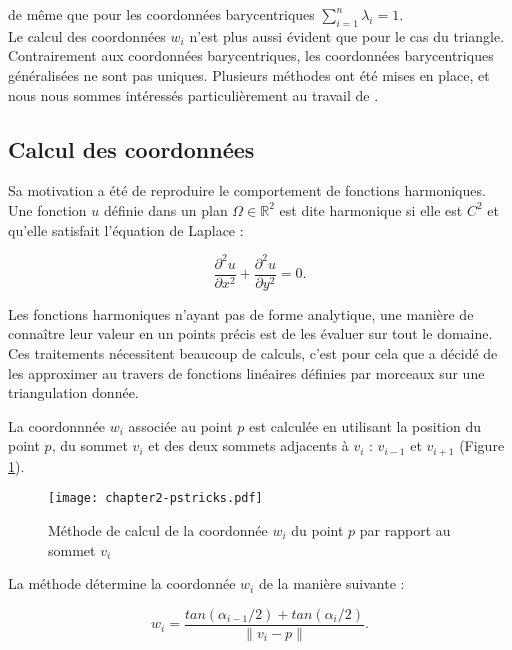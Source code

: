 de même que pour les coordonnées barycentriques $\sum_{i=1}^n \lambda_i = 1$.
\\

Le calcul des coordonnées $w_i$ n'est plus aussi évident que pour le cas du
triangle. Contrairement aux coordonnées barycentriques, les coordonnées
barycentriques généralisées ne sont pas uniques. Plusieurs méthodes ont été
mises en place, et nous nous sommes intéressés particulièrement au travail de
\cite{Flo03}.

\subsection{Calcul des coordonnées}

Sa motivation a été de reproduire le comportement de fonctions harmoniques.
Une fonction $u$ définie dans un plan $\Omega \in \mathbb{R}^2$ est dite
harmonique si elle est $C^2$ et qu'elle satisfait l'équation de Laplace :

\begin{equation}
  \frac{\partial^2 u}{\partial x^2} + \frac{\partial^2 u}{\partial y^2} = 0.
\end{equation}

Les fonctions harmoniques n'ayant pas de forme analytique, une manière de
connaître leur valeur en un points précis est de les évaluer sur tout le
domaine. Ces traitements nécessitent beaucoup de calculs, c'est pour cela que
\cite{Flo03} a décidé de les approximer au travers de fonctions linéaires
définies par morceaux sur une triangulation donnée.

La coordonnnée $w_i$ associée au point $p$ est calculée en utilisant la
position du point $p$, du sommet $v_i$ et des deux sommets adjacents à $v_i$ :
$v_{i-1}$ et $v_{i+1}$ (Figure \ref{DEFcal}).

\begin{figure}[ht]
  \begin{center}
    \texttt{[image: chapter2-pstricks.pdf]}

    \caption[Méthode de calcul MVC] {Méthode de calcul de la coordonnée $w_i$
du point $p$ par rapport au sommet $v_i$}

    \label{DEFcal}   \end{center} \end{figure}

La méthode détermine la coordonnée $w_i$ de la manière suivante :

\begin{equation}
  w_i = \frac{tan(\alpha_{i-1}/2) + tan(\alpha_i/2)}{\| v_i - p \|}.
  \label{DEFcoo}
\end{equation}


